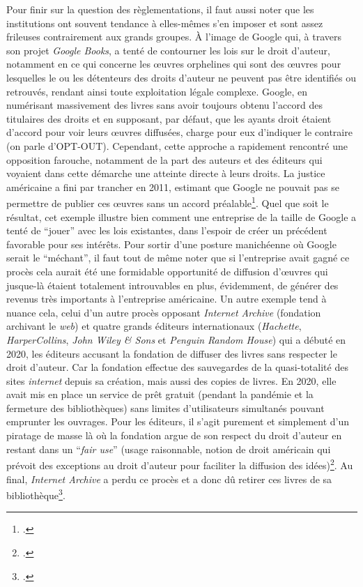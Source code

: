 Pour finir sur la question des règlementations, il faut aussi noter que les institutions ont souvent tendance à elles-mêmes s’en imposer et sont assez frileuses contrairement aux grands groupes. À l’image de Google qui, à travers son projet \textit{Google Books}, a tenté de contourner les lois sur le droit d’auteur, notamment en ce qui concerne les œuvres orphelines qui sont des œuvres pour lesquelles le ou les détenteurs des droits d’auteur ne peuvent pas être identifiés ou retrouvés, rendant ainsi toute exploitation légale complexe. Google, en numérisant massivement des livres sans avoir toujours obtenu l’accord des titulaires des droits et en supposant, par défaut, que les ayants droit étaient d’accord pour voir leurs œuvres diffusées, charge pour eux d’indiquer le contraire (on parle d’OPT-OUT). Cependant, cette approche a rapidement rencontré une opposition farouche, notamment de la part des auteurs et des éditeurs qui voyaient dans cette démarche une atteinte directe à leurs droits. La justice américaine a fini par trancher en 2011, estimant que Google ne pouvait pas se permettre de publier ces œuvres sans un accord préalable\footcite{ertzscheid2019}. Quel que soit le résultat, cet exemple illustre bien comment une entreprise de la taille de Google a tenté de \enquote{jouer} avec les lois existantes, dans l’espoir de créer un précédent favorable pour ses intérêts. Pour sortir d’une posture manichéenne où Google serait le \enquote{méchant}, il faut tout de même noter que si l’entreprise avait gagné ce procès cela aurait été une formidable opportunité de diffusion d’œuvres qui jusque-là étaient totalement introuvables en plus, évidemment, de générer des revenus très importants à l’entreprise américaine. Un autre exemple tend à nuance cela, celui d’un autre procès opposant \textit{Internet Archive} (fondation archivant le \textit{web}) et quatre grands éditeurs internationaux (\textit{Hachette}, \textit{HarperCollins}, \textit{John Wiley \& Sons} et \textit{Penguin Random House}) qui a débuté en 2020, les éditeurs accusant la fondation de diffuser des livres sans respecter le droit d’auteur. Car la fondation effectue des sauvegardes de la quasi-totalité des sites \textit{internet} depuis sa création, mais aussi des copies de livres. En 2020, elle avait mis en place un service de prêt gratuit (pendant la pandémie et la fermeture des bibliothèques) sans limites d’utilisateurs simultanés pouvant emprunter les ouvrages. Pour les éditeurs, il s’agit purement et simplement d’un piratage de masse là où la fondation argue de son respect du droit d'auteur en restant dans un \enquote{\textit{fair use}} (usage raisonnable, notion de droit américain qui prévoit des exceptions au droit d’auteur pour faciliter la diffusion des idées)\footcite{noauthor_aux_2023}. Au final, \textit{Internet Archive} a perdu ce procès et a donc dû retirer ces livres de sa bibliothèque\footcite{noauthor_condamnee_nodate}.


